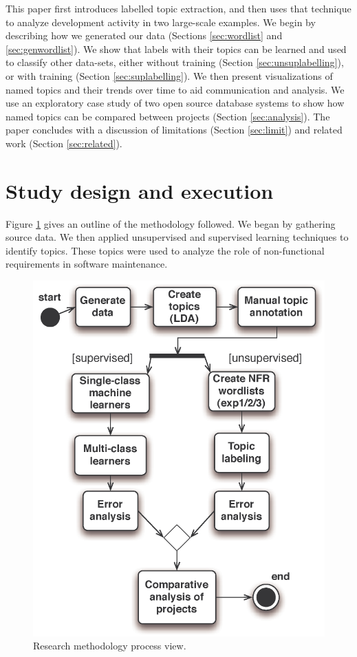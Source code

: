 \documentclass[]{sig-alternate}
\begin{document}
This paper first introduces labelled topic extraction, and then uses that technique to analyze development activity in two large-scale examples. 
We begin by describing how we generated our data (Sections  \ref{sec:wordlist} and \ref{sec:genwordlist}). 
We show that labels with their topics can be learned and used to classify other data-sets, either without training (Section \ref{sec:unsuplabelling}), or with training (Section \ref{sec:suplabelling}). 
We then present visualizations of named topics and their trends over time to aid communication and analysis. 
We use an exploratory case study of two open source database systems to show how named topics can be compared between projects  (Section \ref{sec:analysis}). 
The paper concludes with a discussion of limitations (Section \ref{sec:limit}) and related work (Section \ref{sec:related}).



\section{Study design and execution}
Figure \ref{fig:process} gives an outline of the methodology followed. 
We began by gathering source data. 
We then applied unsupervised and supervised learning techniques to identify topics. 
These topics were used to analyze the role of non-functional requirements in software maintenance.

\begin{figure}
  \centering
 \includegraphics[width=.45\textwidth]{figures/process-model}
 \caption{Research methodology process view.}
  \label{fig:process}
\end{figure}
\end{document}
